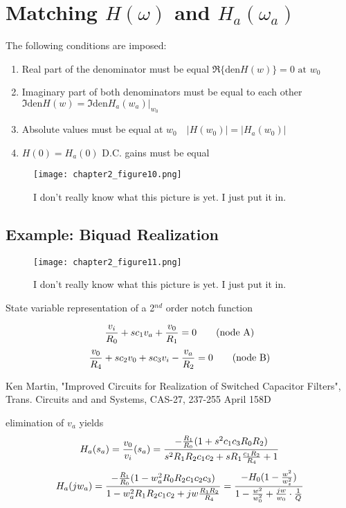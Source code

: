\documentclass[11pt,fleqn]{book} %
\begin{document}
\section{Matching $H(\omega)$ and $H_a(\omega_a)$}

The following conditions are imposed:
\begin{enumerate}
 \item Real part of the denominator must be equal $\Re\{\text{den}H(w)\}=0\text{ at }w_0$
 \item Imaginary part of both denominators must be equal to each other\\
 $\Im{\text{den}H(w)}=\Im{\text{den}H_a(w_a)}|_{w_0}$
 \item Absolute values must be equal at $w_0\quad|H(w_0)|=|H_a(w_0)|$
 \item $H(0)=H_a(0)$ D.C. gains must be equal
\end{enumerate}

\begin{figure}[h]
  \centering\texttt{[image: chapter2\_figure10.png]}
  \caption{I don't really know what this picture is yet. I just put it in.}
\end{figure}

\subsection{Example: Biquad Realization}

\begin{figure}[h]
  \centering\texttt{[image: chapter2\_figure11.png]}
  \caption{I don't really know what this picture is yet. I just put it in.}
\end{figure}

State variable representation of a 2$^{nd}$ order notch function

\begin{equation}
 {v_i\over R_0}+sc_1v_a+{v_0\over R_1}=0 \tag{\text{node A}}
\end{equation}
\begin{equation}
 {v_0\over R_4} +sc_2v_0+sc_3v_i-{v_a\over R_2}=0 \tag{\text{node B}}
\end{equation}

\begin{tcolorbox}
 Ken Martin, "Improved Circuits for Realization of Switched Capacitor Filters", Trans. Circuits and and Systems, CAS-27, 237-255 April 158D
\end{tcolorbox}

elimination of $v_a$ yields
$$H_a(s_a)={v_0\over v_i}(s_a)={-{R_1\over R_0}(1+s^2c_1c_3R_0R_2)\over s^2R_1R_2c_1c_2+sR_1{c_1R_2\over R_4}+1}$$
$$H_a(jw_a)={-{R_1\over R_0}(1-w_a^2R_0R_2c_1c_2c_3)\over 1-w_a^2R_1R_2c_1c_2+jw{R_1R_2\over R_4}}={-H_0(1-{w^2\over w_z^2})\over 1-{w^2\over w_0^2}+{jw\over w_0}\cdot{1\over Q}}$$
\end{document}
